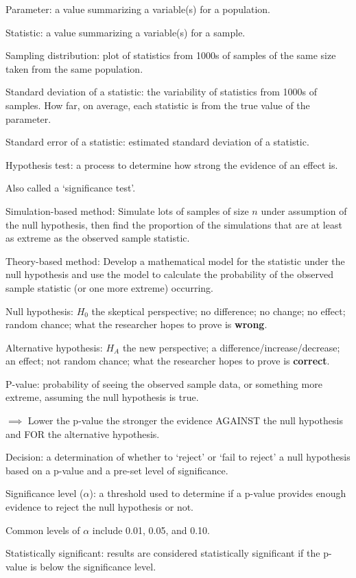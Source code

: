\documentclass[
]{report}
\newcommand{\rgi}{\hspace{24pt}}  %
\begin{document}
Parameter: a value summarizing a variable(s) for a population.

Statistic: a value summarizing a variable(s) for a sample.

Sampling distribution: plot of statistics from 1000s of samples of the same size taken from the same population.

Standard deviation of a statistic: the variability of statistics from 1000s of samples. How far, on average, each statistic is from the true value of the parameter.

Standard error of a statistic: estimated standard deviation of a statistic.

Hypothesis test: a process to determine how strong the evidence of an effect is.

\rgi Also called a `significance test'.

Simulation-based method: Simulate lots of samples of size \(n\) under assumption of the null hypothesis, then find the proportion of the simulations that are at least as extreme as the observed sample statistic.

Theory-based method: Develop a mathematical model for the statistic under the null hypothesis and use the model to calculate the probability of the observed sample statistic (or one more extreme) occurring.

Null hypothesis: \(H_0\) the skeptical perspective; no difference; no change; no effect; random chance; what the researcher hopes to prove is \textbf{wrong}.

Alternative hypothesis: \(H_A\) the new perspective; a difference/increase/decrease; an effect; not random chance; what the researcher hopes to prove is \textbf{correct}.

P-value: probability of seeing the observed sample data, or something more extreme, assuming the null hypothesis is true.

\(\implies\) Lower the p-value the stronger the evidence AGAINST the null hypothesis and FOR the alternative hypothesis.

Decision: a determination of whether to `reject' or `fail to reject' a null hypothesis based on a p-value and a pre-set level of significance.

Significance level (\(\alpha\)): a threshold used to determine if a p-value provides enough evidence to reject the null hypothesis or not.

\rgi Common levels of \(\alpha\) include 0.01, 0.05, and 0.10.

Statistically significant: results are considered statistically significant if the p-value is below the significance level.
\end{document}
